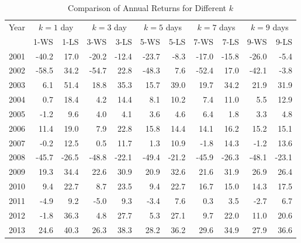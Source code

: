 \documentclass{article}
\begin{document}
\begin{table}[!ht]
    \centering
    \caption{Comparison of Annual Returns  for Different $k$ }
    \medskip
    \begin{tabular}{l | rr| rr| rr| rr| rr}
    \hline
\multirow{2}{*}{Year} & \multicolumn{2}{c|}{$k=1$ day}   
& \multicolumn{2}{c|}{$k=3$ day}  & \multicolumn{2}{c|}{$k=5$ days}   
& \multicolumn{2}{c|}{$k=7$ days}   & \multicolumn{2}{c}{$k=9$ days}\\
 & 1-WS & 1-LS & 3-WS & 3-LS & 5-WS & 5-LS & 7-WS & 7-LS & 9-WS & 9-LS \\
\hline
                2001 & \cellcolor{red!25}-40.2 & \cellcolor{green!25}17.0 & -20.2 & -12.4 & -23.7 & -8.3 & -17.0 & -15.8 & -26.0 & -5.4 \\
2002 & \cellcolor{red!25}-58.5 & \cellcolor{green!25}34.2 & -54.7 & 22.8 & -48.3 & 7.6 & -52.4 & 17.0 & -42.1 & -3.8 \\
2003 & \cellcolor{red!25}6.1 & \cellcolor{green!25}51.4 & 18.8 & 35.3 & 15.7 & 39.0 & 19.7 & 34.2 & 21.9 & 31.9 \\
2004 & \cellcolor{red!25}0.7 & \cellcolor{green!25}18.4 & 4.2 & 14.4 & 8.1 & 10.2 & 7.4 & 11.0 & 5.5 & 12.9 \\
2005 & \cellcolor{red!25}-1.2 & \cellcolor{green!25}9.6 & 4.0 & 4.1 & 3.6 & 4.6 & 6.4 & 1.8 & 3.3 & 4.8 \\
2006 & 11.4 & 19.0 & \cellcolor{red!25}7.9 & \cellcolor{green!25}22.8 & 15.8 & 14.4 & 14.1 & 16.2 & 15.2 & 15.1 \\
2007 & -0.2 & 12.5 & 0.5 & 11.7 & 1.3 & 10.9 & \cellcolor{red!25}-1.8 & \cellcolor{green!25}14.3 & -1.2 & 13.6 \\
2008 & -45.7 & -26.5 & -48.8 & -22.1 & \cellcolor{red!25}-49.4 & \cellcolor{green!25}-21.2 & -45.9 & -26.3 & -48.1 & -23.1 \\
2009 & \cellcolor{red!25}19.3 & \cellcolor{green!25}34.4 & 22.6 & 30.9 & 20.9 & 32.6 & 21.6 & 31.9 & 26.9 & 26.4 \\
2010 & 9.4 & 22.7 & \cellcolor{red!25}8.7 & \cellcolor{green!25}23.5 & 9.4 & 22.7 & 16.7 & 15.0 & 14.3 & 17.5 \\
2011 & -4.9 & 9.2 & \cellcolor{red!25}-5.0 & \cellcolor{green!25}9.3 & -3.4 & 7.6 & 0.3 & 3.5 & -2.7 & 6.7 \\
2012 & \cellcolor{red!25}-1.8 & \cellcolor{green!25}36.3 & 4.8 & 27.7 & 5.3 & 27.1 & 9.7 & 22.0 & 11.0 & 20.6 \\
2013 & \cellcolor{red!25}24.6 & \cellcolor{green!25}40.3 & 26.3 & 38.3 & 28.2 & 36.2 & 29.6 & 34.9 & 27.9 & 36.6 \\

\end{tabular}
\end{table}
\end{document}
